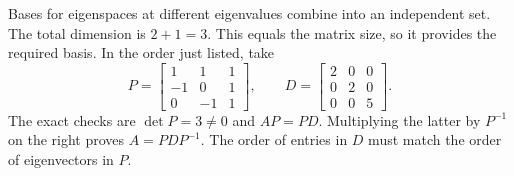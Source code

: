 Bases for eigenspaces at different eigenvalues combine into an independent set. The total dimension is $2+1=3$.
This equals the matrix size, so it provides the required basis. In the order just listed, take
\[P=\begin{bmatrix}1&1&1\\-1&0&1\\0&-1&1\end{bmatrix},\qquad D=\begin{bmatrix}2&0&0\\0&2&0\\0&0&5\end{bmatrix}.\]
The exact checks are $\det P=3\ne0$ and $AP=PD$. Multiplying the latter by $P^{-1}$ on the right proves $A=PDP^{-1}$. The order of entries in $D$ must match the order of eigenvectors in $P$.



